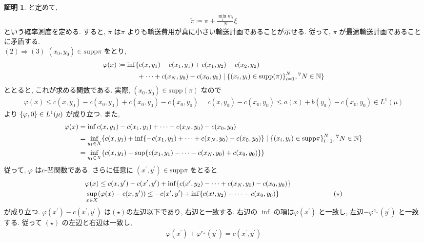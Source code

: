 \documentclass[10pt, fleqn, label-section=none, titlepage]{bxjsarticle}
\theoremstyle{definition}
\newtheorem*{pf*}{証明}
\newcommand{\any}{{}^{\forall}}
\newcommand{\cbra}[1]{\mleft\{#1\mright\}}
\newcommand{\naraba}{\Rightarrow}
\newcommand{\supp}{\textrm{supp}}
\renewcommand{\;}{\, ; \,}
\begin{document}
\begin{pf*}
と定めて, 
\begin{align*} \tilde \pi \coloneqq \pi + \frac{\min_i m_i }{N}\xi \end{align*}
という確率測度を定める. すると, $\tilde \pi$ は$\pi$ よりも輸送費用が真に小さい輸送計画であることが示せる. 従って, $\pi$ が最適輸送計画であることに矛盾する.  \\
$(2) \naraba (3)$ $(x_0, y_0) \in \supp \pi$ をとり, 
\begin{align*} 
&\varphi(x) \coloneqq \inf \{ c(x,y_1) - c(x_1, y_1) + c(x_1, y_2) - c(x_2, y_2)   \\  &\quad \quad \quad \quad \quad  + \cdots + c(x_N, y_0) - c(x_0, y_0)  \mid \cbra{(x_i, y_i) \in \supp (\pi) }_{i=1}^N  , \any N \in \mathbb N  \} \end{align*}
ととると, これが求める関数である. 実際, $(x_0, y_0) \in \supp(\pi)$ なので
\begin{align*} \varphi(x) \leq c(x, y_0) - c(x_0, y_0) + c(x_0, y_0) - c(x_0, y_0) = c(x, y_0) - c(x_0, y_0) \leq a(x) + b(y_0) - c(x_0, y_0) \in L^1 (\mu) \end{align*}
より $\cbra{\varphi, 0} \in L^1 (\mu)$ が成り立つ. また, 
\begin{align*} \varphi(x) &= \inf c(x, y_1) - c(x_1, y_1) + \cdots + c(x_N, y_0) - c(x_0, y_0) \\
&= \inf_{y_1 \in X } \{c(x, y_1) + \inf \{ - c(x_1, y_1) + \cdots + c(x_N, y_0) - c(x_0, y_0) \} \mid \cbra{(x_i, y_i) \in \supp \pi }_{i=1}^N , \any N \in \mathbb N \} \\
&= \inf_{y_1 \in X} \cbra{c(x, y_1) - \sup \cbra{c(x_1, y_1) - \cdots - c(x_N, y_0) + c(x_0, y_0) } }  \end{align*}
従って, $\varphi$ はc-凹関数である. さらに任意に $(x^{\prime}, y^{\prime}) \in \supp \pi$ をとると
\begin{align*} &\varphi(x) \leq c(x, y^{\prime}) - c(x^{\prime}, y^{\prime}) + \inf \cbra{c(x^{\prime}, y_2) - \cdots + c(x_N, y_0) - c(x_0, y_0)  } \\
&\sup_{x\in X} (\varphi(x) - c(x, y^\prime) ) \leq - c(x^\prime, y^\prime) + \inf \cbra{c(x\prime, y_2) - \cdots - c(x_0, y_0) } \hspace{80pt} (\star)\end{align*}
が成り立つ. $\varphi(x^\prime) - c (x ^\prime , y^\prime ) $ は$(\star)$の左辺以下であり, 右辺と一致する. 右辺の $\inf$ の項は$\varphi(x^\prime)$ と一致し, 左辺$- \varphi^{c_+} (y^\prime)$ と一致する. 従って $(\star)$ の左辺と右辺は一致し, 
\begin{align*}  \varphi(x^\prime) + \varphi^{c_+} (y^\prime)=  c(x^\prime , y^\prime )  \end{align*}

\end{pf*}
\end{document}
